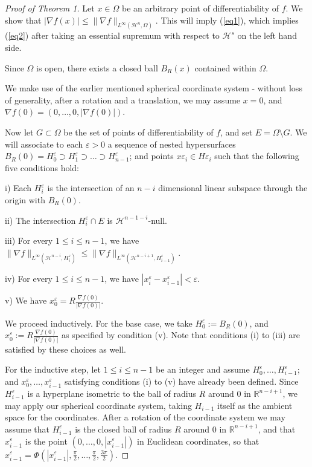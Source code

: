 \documentclass{article}
\begin{document}
\begin{proof}[Proof of Theorem 1]

Let $x \in \Omega$ be an arbitrary point of differentiability of $f$. We show that $|\nabla f(x)| \leq \|\nabla f\|_{L^\infty (\mathcal H^n, \Omega)}$. This will imply (\ref{eq1}), which implies (\ref{eq2}) after taking an essential supremum with respect to $\mathcal H^s$ on the left hand side. 

\noindent Since $\Omega$ is open, there exists a closed ball $B_R(x)$ contained within $\Omega$.

\noindent We make use of the earlier mentioned spherical coordinate system - without loss of generality, after a rotation and a translation, we may assume $x = 0$, and $\nabla f(0) = (0, \dots, 0, |\nabla f(0)|)$. 

\noindent Now let $G \subset \Omega$ be the set of points of differentiability of $f$, and set $E = \Omega \setminus G$. We will associate to each $\varepsilon > 0$ a sequence of nested hypersurfaces $B_R (0) = H^\varepsilon_0 \supset H^\varepsilon_1 \supset \dots \supset H^\varepsilon_{n-1}$; and points $x\varepsilon_i \in H\varepsilon_i$ such that the following five conditions hold: 

\noindent i) Each $H^\varepsilon_i$ is the intersection of an $n-i$ dimensional linear subspace through the origin with $B_R(0)$.

\noindent ii) The intersection $H^\varepsilon_i \cap E$ is $\mathcal H^{n-1-i}$-null.

\noindent iii) For every $1 \leq i \leq n-1$, we have $\|\nabla f\|_{L^\infty (\mathcal H^{n-i}, H^\varepsilon_i)} \leq \|\nabla f\|_{L^\infty (\mathcal H^{n-i+1}, H^\varepsilon_{i-1})}$.

\noindent iv) For every $1 \leq i \leq n-1$, we have $|x^\varepsilon_i -x^\varepsilon_{i-1}| < \varepsilon$.

\noindent v) We have $x^\varepsilon_0 =R\frac{\nabla f(0)}{|\nabla f(0)|}$.

\noindent We proceed inductively. For the base case, we take $H^\varepsilon_0 := B_R (0)$, and $x^\varepsilon_0 := R\frac{\nabla f(0)}{|\nabla f(0)|}$ as specified by condition (v). Note that conditions (i) to (iii) are satisfied by these choices as well.

\noindent For the inductive step, let $1 \leq i \leq n-1$ be an integer and assume $H^\varepsilon_0, \dots, H^\varepsilon_{i-1}$; and $x^\varepsilon_0, \dots, x^\varepsilon_{i-1}$ satisfying conditions (i) to (v) have already been defined. Since $H^\varepsilon_{i-1}$ is a hyperplane isometric to the ball of radius $R$ around $0$ in $\mathbb R^{n-i+1}$, we may apply our spherical coordinate system, taking $H_{i-1}$ itself as the ambient space for the coordinates. After a rotation of the coordinate system we may assume that $H^\varepsilon_{i-1}$ is the closed ball of radius $R$ around $0$ in $\mathbb R^{n-i+1}$, and that $x^\varepsilon_{i-1}$ is the point $(0, \dots, 0, |x^\varepsilon_{i-1}|)$ in Euclidean coordinates, so that $x^\varepsilon_{i-1} = \Phi(|x^\varepsilon_{i-1}|, \frac{\pi}{2}, \dots, \frac{\pi}{2}, \frac{3\pi}{2})$.


\end{proof}
\end{document}
